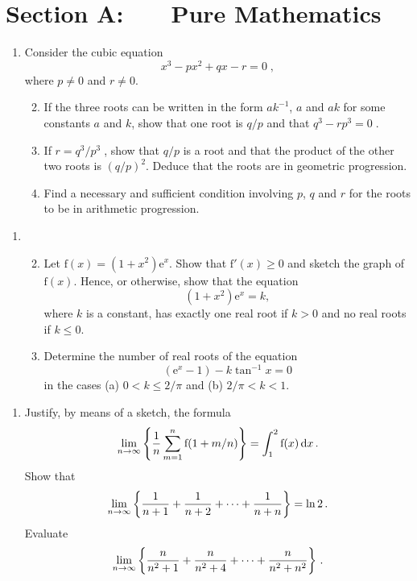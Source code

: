 \documentclass[a4, 11pt]{report}
\newlength{\qspace}
\newcounter{qnumber}
\newenvironment{question}%
 {\vspace{\qspace}
  \begin{enumerate}[\bfseries 1\quad][10]%
    \setcounter{enumi}{\value{qnumber}}%
    \item%
 }
{
  \end{enumerate}
  \filbreak
  \stepcounter{qnumber}
 }
\newenvironment{questionparts}[1][1]%
 {
  \begin{enumerate}[\bfseries (i)]%
    \setcounter{enumii}{#1}
    \addtocounter{enumii}{-1}
    \setlength{\itemsep}{5mm}
    \setlength{\parskip}{8pt}
 }
 {
  \end{enumerate}
 }
\def\d{{\mathrm d}}
\def\e{{\mathrm e}}
\def\f{{\mathrm f}}
\def\le{\leqslant}
\def\ge{\geqslant}
\begin{document}
\setcounter{page}{2}

 
\section*{Section A: \ \ \ Pure Mathematics}

\begin{question}
Consider the cubic equation
\[
x^3-px^2+qx-r=0\;,
\]
where $p\ne0$ and $r\ne 0$.

\begin{questionparts}

\item If the three roots    
can be written in the form $ak^{-1}$, $a$ and $ak$ for some 
constants $a$ and $k$, show that 
one root is $q/p$ and that
$
q^3 -rp^3=0\;.
$

\item
If $
r=q^3/p^3\;$, show that $q/p$ is a root and that the product of the 
other two roots is $(q/p)^2$. Deduce that the roots are 
in geometric progression.

\item
Find a necessary and sufficient condition involving $p$, $q$ and $r$ 
for the  roots 
 to be  in  arithmetic progression.
\end{questionparts}
\end{question}

\begin{question}
\begin{questionparts}

\item
Let $\f(x)=(1+x^2)\e^x$. Show that $\f'(x)\ge 0$ and sketch the graph
of $\f(x)$. 
Hence, or otherwise, show that
the equation
\[
 (1+x^2)\e^x = k,
\]
where $k$ is a constant,
has exactly one real root if  $k>0$ and no real roots if  $k\le 0$.


\item
Determine 
the number of real roots of the equation
$$
(\e^x-1) - k \tan^{-1} x=0
$$ 
in the cases (a) $0<k\le 2/\pi$ and (b) $2/\pi<k<1$.
\end{questionparts}

\end{question}

\begin{question}
Justify, by means of a sketch, the formula
$$
\lim_{n\rightarrow\infty}\left\{{1\over n}\sum_{m=1}^n
\f(1+m/n)\right\} = \int_1^2 \f(x)\,\d x \,.
$$
Show that 
$$
\lim_{n\rightarrow\infty}\left\{{1\over n+1} + {1\over n+2} + \cdots
+ {1\over n+n}\right\} = \ln 2 \,.
$$
Evaluate
$$
\lim_{n\rightarrow\infty}\left\{{n\over n^2+1} + {n\over n^2+4}
 + \cdots + {n\over n^2+n^2}\right\}\,.
$$
\end{question}
\end{document}
